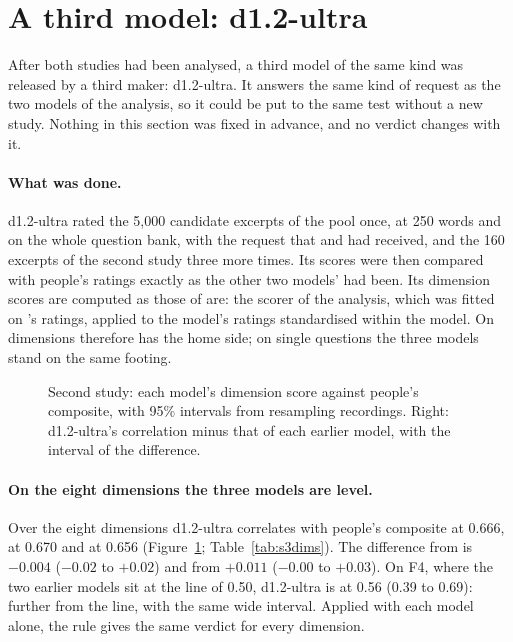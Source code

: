 \section{A third model: d1.2-ultra}\label{sec:third}

After both studies had been analysed, a third model of the same kind was released by a third maker: d1.2-ultra.
It answers the same kind of request as the two models of the analysis, so it could be put to the same test
without a new study. Nothing in this section was fixed in advance, and no verdict changes with it.

\paragraph{What was done.} d1.2-ultra rated the 5{,}000 candidate excerpts of the pool once, at 250 words and on
the whole question bank, with the request that \jev{} and \drex{} had received, and the 160 excerpts of the
second study three more times. Its scores were then compared with people's ratings exactly as the other two
models' had been. Its dimension scores are computed as those of \drex{} are: the scorer of the analysis, which
was fitted on \jev{}'s ratings, applied to the model's ratings standardised within the model. On dimensions
\jev{} therefore has the home side; on single questions the three models stand on the same footing.

\begin{figure}[!htb]\centering

\caption{Second study: each model's dimension score against people's composite, with 95\% intervals from
resampling recordings. Right: d1.2-ultra's correlation minus that of each earlier model, with the interval of
the difference.}\label{fig:s3dims}
\end{figure}

\paragraph{On the eight dimensions the three models are level.} Over the eight dimensions d1.2-ultra correlates
with people's composite at 0.666, \jev{} at 0.670 and \drex{} at 0.656 (Figure~\ref{fig:s3dims};
Table~\ref{tab:s3dims}). The difference from \jev{} is $-0.004$ ($-0.02$ to $+0.02$) and from \drex{} $+0.011$
($-0.00$ to $+0.03$). On F4, where the two earlier models sit at the line of 0.50, d1.2-ultra is at 0.56 (0.39
to 0.69): further from the line, with the same wide interval. Applied with each model alone, the rule gives the
same verdict for every dimension.

